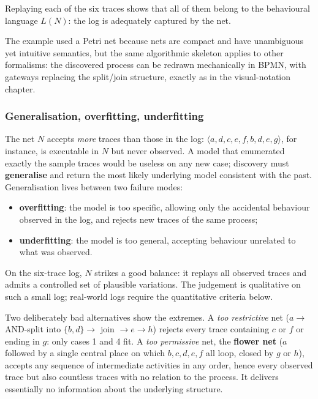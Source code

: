 Replaying each of the six traces shows that all of them belong to the behavioural language $L(N)$: the log is adequately captured by the net.

The example used a Petri net because nets are compact and have unambiguous yet intuitive semantics, but the same algorithmic skeleton applies to other formalisms: the discovered process can be redrawn mechanically in BPMN, with gateways replacing the split/join structure, exactly as in the visual-notation chapter.

\subsubsection{Generalisation, overfitting, underfitting}

The net $N$ accepts \emph{more} traces than those in the log: $\langle a, d, c, e, f, b, d, e, g\rangle$, for instance, is executable in $N$ but never observed. A model that enumerated exactly the sample traces would be useless on any new case; discovery must \textbf{generalise} and return the most likely underlying model consistent with the past. Generalisation lives between two failure modes:
\begin{itemize}
  \item \textbf{overfitting}: the model is too specific, allowing only the accidental behaviour observed in the log, and rejects new traces of the same process;
  \item \textbf{underfitting}: the model is too general, accepting behaviour unrelated to what was observed.
\end{itemize}
On the six-trace log, $N$ strikes a good balance: it replays all observed traces and admits a controlled set of plausible variations. The judgement is qualitative on such a small log; real-world logs require the quantitative criteria below.

Two deliberately bad alternatives show the extremes. A \emph{too restrictive} net ($a \to$ AND-split into $\{b, d\} \to$ join $\to e \to h$) rejects every trace containing $c$ or $f$ or ending in $g$: only cases 1 and 4 fit. A \emph{too permissive} net, the \textbf{flower net} ($a$ followed by a single central place on which $b, c, d, e, f$ all loop, closed by $g$ or $h$), accepts any sequence of intermediate activities in any order, hence every observed trace but also countless traces with no relation to the process. It delivers essentially no information about the underlying structure.

